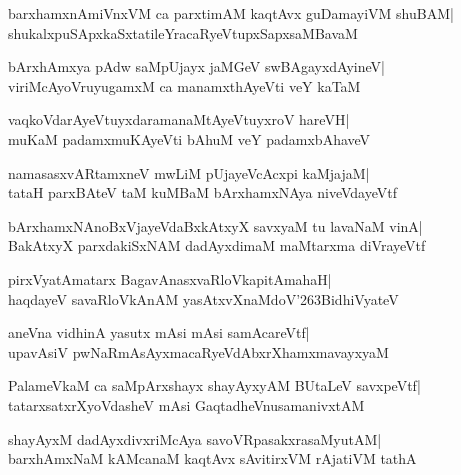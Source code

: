 \documentclass[twoside,12pt,openright]{book}
\def\S{\char'263}
\newcounter{shloka}[chapter]
\begin{document}
\begin{shloka}%
barxhamxnAmiVnxVM ca parxtimAM kaqtAvx guDamayiVM shuBAM|\\
shukalxpuSApxkaSxtatileYracaRyeVtupxSapxsaMBavaM
\end{shloka}

\begin{shloka}%
bArxhAmxya pAdw saMpUjayx jaMGeV swBAgayxdAyineV|\\
viriMcAyoVruyugamxM ca manamxthAyeVti veY kaTaM
\end{shloka}

\begin{shloka}%
vaqkoVdarAyeVtuyxdaramanaMtAyeVtuyxroV hareVH|\\
muKaM padamxmuKAyeVti bAhuM veY padamxbAhaveV
\end{shloka}

\begin{shloka}%
namasasxvARtamxneV mwLiM pUjayeVcAcxpi kaMjajaM|\\
tataH parxBAteV taM kuMBaM bArxhamxNAya niveVdayeVtf
\end{shloka}

\begin{shloka}%
bArxhamxNAnoBxVjayeVdaBxkAtxyX savxyaM tu lavaNaM vinA|\\
BakAtxyX parxdakiSxNAM dadAyxdimaM maMtarxma diVrayeVtf
\end{shloka}

\begin{shloka}%
pirxVyatAmatarx BagavAnasxvaRloVkapitAmahaH|\\
haqdayeV savaRloVkAnAM yasAtxvXnaMdoV\S BidhiVyateV
\end{shloka}

\begin{shloka}%
aneVna vidhinA yasutx mAsi mAsi samAcareVtf|\\
upavAsiV pwNaRmAsAyxmacaRyeVdAbxrXhamxmavayxyaM
\end{shloka}

\begin{shloka}%
PalameVkaM ca saMpArxshayx shayAyxyAM BUtaLeV savxpeVtf|\\
tatarxsatxrXyoVdasheV mAsi GaqtadheVnusamanivxtAM
\end{shloka}

\begin{shloka}%
shayAyxM dadAyxdivxriMcAya savoVRpasakxrasaMyutAM|\\
barxhAmxNaM kAMcanaM kaqtAvx sAvitirxVM rAjatiVM tathA
\end{shloka}
\end{document}
